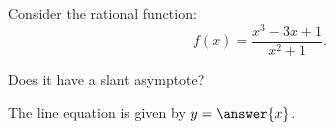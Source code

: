 \documentclass{ximera}
\author{Ivo Terek}
\begin{document}
\begin{exercise}

  Consider the rational function:
$$  f(x) = \frac{x^3-3x+1}{x^2+1}. $$

  Does it have a slant asymptote?

  \begin{multipleChoice}
  \end{multipleChoice}

  \begin{exercise}
    The line equation is given by $y= \answer{x}$.
  \end{exercise}

\end{exercise}
\end{document}
